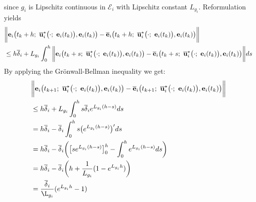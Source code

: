 \begin{gg_box}
\begin{align}
\end{align}
since $g_i$ is Lipschitz continuous in $\mathcal{E}_i$ with Lipschitz constant
$L_{g_i}$. Reformulation yields
\begin{align}
  &\bigg\| \vect{e}_i\big(t_k+h;\ \overline{\vect{u}}_i^{\star}\big(\cdot;\ \vect{e}_i(t_k)\big), \vect{e}_i(t_k)\big) -
  \overline{\vect{e}}_i\big(t_k+h;\ \overline{\vect{u}}_i^{\star}\big(\cdot;\ \vect{e}_i(t_k)\big), \vect{e}_i(t_k)\big) \bigg\| \\
  &\leq h \overline{\delta}_i
     + L_{g_i} \int_{0}^{h} \bigg\| \vect{e}_i\big(t_k + s;\ \overline{\vect{u}}_i^{\star}\big(\cdot;\ \vect{e}_i(t_k)\big), \vect{e}_i(t_k)\big) -
  \overline{\vect{e}}_i\big(t_k + s;\ \overline{\vect{u}}_i^{\star}\big(\cdot;\ \vect{e}_i(t_k)\big), \vect{e}_i(t_k)\big) \bigg\| ds \\
\end{align}
By applying the Gr\"{o}nwall-Bellman inequality we get:
\begin{align}
  &\bigg\| \vect{e}_i\big(t_{k+1};\ \overline{\vect{u}}_i^{\star}\big(\cdot;\ \vect{e}_i(t_k)\big), \vect{e}_i(t_k)\big) -
    \overline{\vect{e}}_i\big(t_{k+1};\ \overline{\vect{u}}_i^{\star}\big(\cdot;\ \vect{e}_i(t_k)\big), \vect{e}_i(t_k)\big) \bigg\| \\
  &\leq h \overline{\delta}_i +  L_{g_i} \int_{0}^{h} s \overline{\delta}_i e^{L_{g_i}(h - s)} ds \\
  &= h \overline{\delta}_i - \overline{\delta}_i \int_{0}^{h} s  \big(e^{L_{g_i}(h - s)}\big)' ds \\
  &= h \overline{\delta}_i -
    \overline{\delta}_i \bigg( \big[s e^{L_{g_i}(h - s)}\big]_0^h
      - \int_{0}^{h} e^{L_{g_i}(h - s)}ds\bigg) \\
  &= h \overline{\delta}_i - \overline{\delta}_i \bigg( h + \dfrac{1}{L_{g_i}} (1- e^{L_{g_i}h})\bigg) \\
  &= \dfrac{\overline{\delta}_i}{\L_{g_i}} (e^{L_{g_i}h} - 1)
\end{align}
\end{gg_box}

